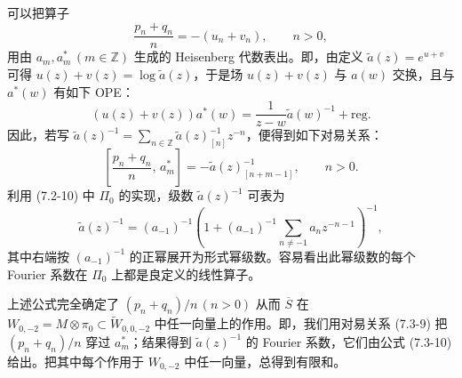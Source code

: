 可以把算子
\[
    \frac{p_n+q_n}{n}=-(u_n+v_n),\qquad n>0,
\]
用由 $a_m,a_m^*\,(m\in\mathbb{Z})$ 生成的 Heisenberg 代数表出。即，由定义 $\widetilde{a}(z)=e^{u+v}$ 可得 $u(z)+v(z)=\log\widetilde{a}(z)$，于是场 $u(z)+v(z)$ 与 $a(w)$ 交换，且与 $a^*(w)$ 有如下 OPE：
\[
    (u(z)+v(z))a^*(w)=\frac{1}{z-w}\widetilde{a}(w)^{-1}+\mathrm{reg.}
\]
因此，若写 $\widetilde{a}(z)^{-1}=\sum_{n\in\mathbb{Z}}\widetilde{a}(z)^{-1}_{[n]}z^{-n}$，便得到如下对易关系：
\begin{equation}
    \left[\frac{p_n+q_n}{n},\,a_m^*\right]=-\widetilde{a}(z)^{-1}_{[n+m-1]},\qquad n>0.
    \tag{7.3-9}
\end{equation}
利用 (7.2-10) 中 $\Pi_0$ 的实现，级数 $\widetilde{a}(z)^{-1}$ 可表为
\begin{equation}
    \widetilde{a}(z)^{-1}=(a_{-1})^{-1}\left(1+(a_{-1})^{-1}\sum_{n\ne-1}a_nz^{-n-1}\right)^{-1},
    \tag{7.3-10}
\end{equation}
其中右端按 $(a_{-1})^{-1}$ 的正幂展开为形式幂级数。容易看出此幂级数的每个 Fourier 系数在 $\Pi_0$ 上都是良定义的线性算子。


上述公式完全确定了 $(p_n+q_n)/n\,(n>0)$ 从而 $\overline{S}$ 在 $W_{0,-2}=M\otimes\pi_0\subset\widetilde{W}_{0,0,-2}$ 中任一向量上的作用。即，我们用对易关系 (7.3-9) 把 $(p_n+q_n)/n$ 穿过 $a_m^*$；结果得到 $\widetilde{a}(z)^{-1}$ 的 Fourier 系数，它们由公式 (7.3-10) 给出。把其中每个作用于 $W_{0,-2}$ 中任一向量，总得到有限和。

